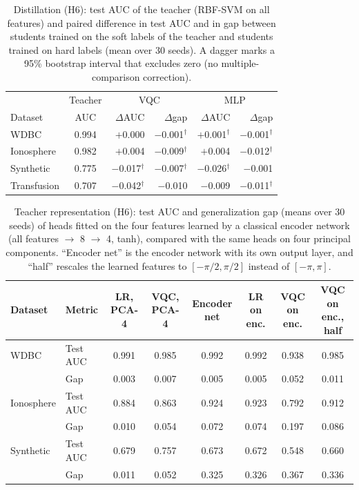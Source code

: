 \begin{table}[t]
\centering
\caption{Distillation (H6): test AUC of the teacher (RBF-SVM on all features) and paired difference in test AUC and in gap between students trained on the soft labels of the teacher and students trained on hard labels (mean over 30 seeds). A dagger marks a 95\% bootstrap interval that excludes zero (no multiple-comparison correction).}
\label{tab:h6kd}
\footnotesize
\setlength{\tabcolsep}{2.5pt}
\begin{tabular}{lcrrrr}
\hline
 & Teacher & \multicolumn{2}{c}{VQC} & \multicolumn{2}{c}{MLP} \\
Dataset & AUC & $\Delta$AUC & $\Delta$gap & $\Delta$AUC & $\Delta$gap \\
\hline
WDBC & 0.994 & $+$0.000 & $-$0.001$^{\dagger}$ & $+$0.001$^{\dagger}$ & $-$0.001$^{\dagger}$ \\
Ionosphere & 0.982 & $+$0.004 & $-$0.009$^{\dagger}$ & $+$0.004 & $-$0.012$^{\dagger}$ \\
Synthetic & 0.775 & $-$0.017$^{\dagger}$ & $-$0.007$^{\dagger}$ & $-$0.026$^{\dagger}$ & $-$0.001 \\
Transfusion & 0.707 & $-$0.042$^{\dagger}$ & $-$0.010 & $-$0.009 & $-$0.011$^{\dagger}$ \\
\hline
\end{tabular}
\end{table}

\begin{table}[t]
\centering
\caption{Teacher representation (H6): test AUC and generalization gap (means over 30 seeds) of heads fitted on the four features learned by a classical encoder network (all features $\rightarrow$ 8 $\rightarrow$ 4, tanh), compared with the same heads on four principal components. ``Encoder net'' is the encoder network with its own output layer, and ``half'' rescales the learned features to $[-\pi/2,\pi/2]$ instead of $[-\pi,\pi]$.}
\label{tab:h6enc}
\footnotesize
\setlength{\tabcolsep}{4pt}
\begin{tabular}{llcccccc}
\hline
Dataset & Metric & LR, PCA-4 & VQC, PCA-4 & Encoder net & LR on enc. & VQC on enc. & VQC on enc., half \\
\hline
WDBC & Test AUC & 0.991 & 0.985 & 0.992 & 0.992 & 0.938 & 0.985 \\
 & Gap & 0.003 & 0.007 & 0.005 & 0.005 & 0.052 & 0.011 \\
Ionosphere & Test AUC & 0.884 & 0.863 & 0.924 & 0.923 & 0.792 & 0.912 \\
 & Gap & 0.010 & 0.054 & 0.072 & 0.074 & 0.197 & 0.086 \\
Synthetic & Test AUC & 0.679 & 0.757 & 0.673 & 0.672 & 0.548 & 0.660 \\
 & Gap & 0.011 & 0.052 & 0.325 & 0.326 & 0.367 & 0.336 \\
\hline
\end{tabular}
\end{table}
